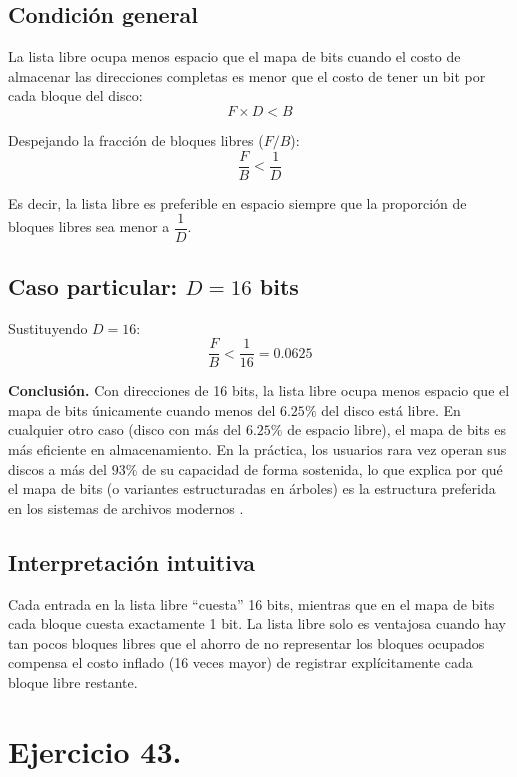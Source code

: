 \documentclass[12pt,letterpaper]{article}
\begin{document}
\subsection*{Condición general}
\noindent
La lista libre ocupa menos espacio que el mapa de bits cuando el costo de almacenar las direcciones completas es
menor que el costo de tener un bit por cada bloque del disco:
\[
F \times D < B
\]

\noindent
Despejando la fracción de bloques libres ($F/B$):
\[
\frac{F}{B} < \frac{1}{D}
\]

\noindent
Es decir, la lista libre es preferible en espacio siempre que la proporción de bloques libres sea menor a
$\dfrac{1}{D}$.

\subsection*{Caso particular: $D = 16$ bits}
\noindent
Sustituyendo $D = 16$:
\[
\frac{F}{B} < \frac{1}{16} = 0.0625
\]

\begin{mdframed}[backgroundcolor=graybox, linecolor=accentblue, linewidth=1pt, roundcorner=4pt]
  \textbf{Conclusión.} Con direcciones de 16 bits, la lista libre ocupa menos espacio que el mapa de bits
  únicamente cuando menos del $6.25\%$ del disco está libre. En cualquier otro caso (disco con más del $6.25\%$
  de espacio libre), el mapa de bits es más eficiente en almacenamiento. En la práctica, los usuarios rara vez
  operan sus discos a más del $93\%$ de su capacidad de forma sostenida, lo que explica por qué el mapa de bits
  (o variantes estructuradas en árboles) es la estructura preferida en los sistemas de archivos modernos
  \cite{tanenbaum2015}.
\end{mdframed}

\subsection*{Interpretación intuitiva}
\noindent
Cada entrada en la lista libre ``cuesta'' 16 bits, mientras que en el mapa de bits cada bloque cuesta exactamente
1 bit. La lista libre solo es ventajosa cuando hay tan pocos bloques libres que el ahorro de no representar los
bloques ocupados compensa el costo inflado (16 veces mayor) de registrar explícitamente cada bloque libre
restante.

\newpage

\section*{Ejercicio 43.}
\end{document}
